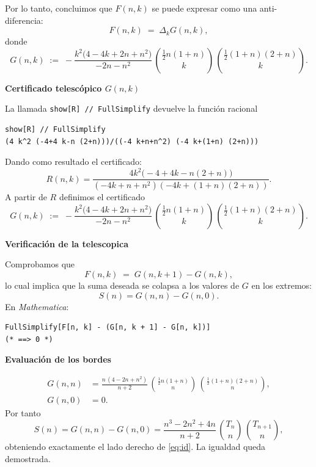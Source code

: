 \begin{solucion}
Por lo tanto, concluimos que $F(n,k)$ se puede expresar como una anti-diferencia:
\[
  F(n,k)\;=\;\Delta_k G(n,k),
\]
donde
\[
  G(n,k)\;:=\;
  -\frac{k^{2}\bigl(4-4k+2n+n^{2}\bigr)}
         {-2n-n^{2}}\,
   \binom{\tfrac12 n(1+n)}{k}\,
   \binom{\tfrac12 (1+n)(2+n)}{k}.
\]

\textbf{Certificado telescópico $G(n,k)$}

La llamada \verb|show[R] // FullSimplify| devuelve la función racional

\begin{lstlisting}[caption={Certificado }]
show[R] // FullSimplify
(4 k^2 (-4+4 k-n (2+n)))/((-4 k+n+n^2) (-4 k+(1+n) (2+n)))
\end{lstlisting}
Dando como resultado el certificado:
\[
  R(n,k)=\frac{4k^{2}\bigl(-4+4k-n(2+n)\bigr)}
               {(-4k+n+n^{2})(-4k+(1+n)(2+n))}.
\]
A partir de $R$ definimos el certificado
\[
  G(n,k)\;:=\;
  -\frac{k^{2}\bigl(4-4k+2n+n^{2}\bigr)}
         {-2n-n^{2}}\,
   \binom{\tfrac12 n(1+n)}{k}\,
   \binom{\tfrac12 (1+n)(2+n)}{k}.
\]

\textbf{Verificación de la telescopica}

Comprobamos que
\[
  F(n,k)\;=\;G(n,k+1)-G(n,k),
\]
lo cual implica que la suma deseada se colapsa a los valores de $G$ en los extremos:
\[
  S(n)=G(n,n)-G(n,0).
\]
En \textit{Mathematica}:

\begin{lstlisting}[caption={Chequeo de telescopía}]
FullSimplify[F[n, k] - (G[n, k + 1] - G[n, k])]
(* ==> 0 *)
\end{lstlisting}

\textbf{Evaluación de los bordes}

\begin{align*}
  G(n,n) &= \frac{n\,(4-2n+n^{2})}{n+2}\,
            \binom{\tfrac12 n(1+n)}{n}\,
            \binom{\tfrac12 (1+n)(2+n)}{n}, \\[6pt]
  G(n,0) &= 0.
\end{align*}
Por tanto
\[
  S(n)=G(n,n)-G(n,0)=
  \frac{n^{3}-2n^{2}+4n}{n+2}\,
  \binom{T_n}{n}\,\binom{T_{n+1}}{n},
\]
obteniendo exactamente el lado derecho de \eqref{eq:id}. La igualdad queda demostrada.

\end{solucion}